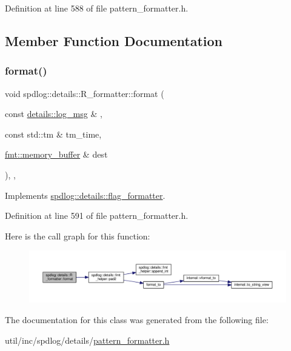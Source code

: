 Definition at line 588 of file pattern\+\_\+formatter.\+h.



\subsection{Member Function Documentation}
\mbox{\label{classspdlog_1_1details_1_1_r__formatter_a1fe66a7fbf57ef47faa59e82132e9051}} 
\subsubsection{\texorpdfstring{format()}{format()}}
{\footnotesize\ttfamily void spdlog\+::details\+::\+R\+\_\+formatter\+::format (\begin{DoxyParamCaption}\item[{const \hyperlink{structspdlog_1_1details_1_1log__msg}{details\+::log\+\_\+msg} \&}]{,  }\item[{const std\+::tm \&}]{tm\+\_\+time,  }\item[{\hyperlink{format_8h_a21cbf729f69302f578e6db21c5e9e0d2}{fmt\+::memory\+\_\+buffer} \&}]{dest }\end{DoxyParamCaption})\hspace{0.3cm}{\ttfamily [inline]}, {\ttfamily [override]}, {\ttfamily [virtual]}}



Implements \hyperlink{classspdlog_1_1details_1_1flag__formatter_a33fb3e42a4c8200cceb833d92b53fb67}{spdlog\+::details\+::flag\+\_\+formatter}.



Definition at line 591 of file pattern\+\_\+formatter.\+h.

Here is the call graph for this function\+:
\nopagebreak
\begin{figure}[H]
\begin{center}
\leavevmode
\includegraphics[width=350pt]{classspdlog_1_1details_1_1_r__formatter_a1fe66a7fbf57ef47faa59e82132e9051_cgraph}
\end{center}
\end{figure}


The documentation for this class was generated from the following file\+:\begin{DoxyCompactItemize}
\item 
util/inc/spdlog/details/\hyperlink{pattern__formatter_8h}{pattern\+\_\+formatter.\+h}\end{DoxyCompactItemize}
